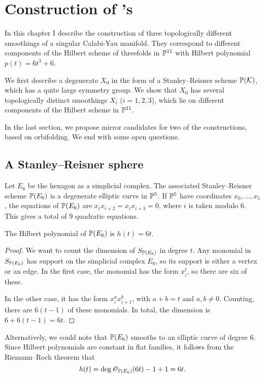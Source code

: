 \chapter{Construction of \CY's}
\label{sec:constructions}

In this chapter I describe the construction of three topologically different smoothings of a singular Calabi-Yau manifold. They correspond to different components of the Hilbert scheme of threefolds in $\P^{11}$ with Hilbert polynomial $p(t)=6t^3+6$. 

We first describe a degenerate \CY $X_0$ in the form of a Stanley--Reisner scheme $\P(\K)$, which has a quite large symmetry group. We show that $X_0$ has several topologically distinct smoothings $X_i$ (${i=1,2,3}$), which lie on different components of the Hilbert scheme in $\P^{11}$.

In the last section, we propose mirror candidates for two of the constructions, based on orbifolding. We end with some open questions.

\section{A Stanley--Reisner sphere}

Let $E_6$ be the hexagon as a simplicial complex. The associated Stanley--Reisner scheme $\P(E_6)$ is a degenerate elliptic curve in $\P^5$. If $\P^5$ have coordinates $x_0,\ldots,x_5$, the equations of $\P(E_6)$ are $x_ix_{i+2}=x_ix_{i+3}=0$, where $i$ is taken modulo $6$. This gives a total of $9$ quadratic equations.

\begin{lemma}
\label{lemma:hilbpoly}
The Hilbert polynomial of $\P(E_6)$ is $h(t)=6t$.
\end{lemma}
\begin{proof}
We want to count the dimension of $S_{\P(E_6)}$ in degree $t$. Any monomial in $S_{\P(E_6)}$ has support on the simplicial complex $E_6$, so its support is either a vertex or an edge. In the first case, the monomial has the form $x_i^t$, so there are six of these.

In the other case, it has the form $x_i^ax_{i+1}^b$, with $a+b=t$ and $a,b \neq 0$. Counting, there are $6(t-1)$ of these monomials. In total, the dimension is $6+6(t-1)=6t$.
\end{proof}
\begin{remark}
Alternatively, we could note that $\P(E_6)$ smooths to an elliptic curve of degree $6$. Since Hilbert polynomials are constant in flat families, it follows from the Riemann--Roch theorem that \[h(t)=\deg \OO_{\P(E_6)}(6t)-1+1=6t.\]
\end{remark}

